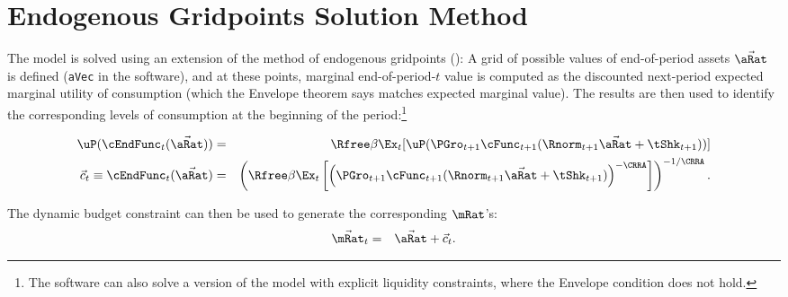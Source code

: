\documentclass[../BufferStockTheory.tex]{subfiles}
\begin{document}
\section{Endogenous Gridpoints Solution Method}

  The model is solved using an extension of the method of endogenous
  gridpoints (\cite{carrollEGM}): A grid of possible values of
  end-of-period assets $\vec{\aRat}$ is defined (\texttt{aVec} in the
  software), and at these points, marginal end-of-period-$t$ value is
  computed as the discounted next-period expected marginal utility of
  consumption (which the Envelope theorem says matches expected
  marginal value).  The results are then used to identify the
  corresponding levels of consumption at the beginning of the period:\footnote{The software can also
solve a version of the model with explicit liquidity constraints, where the Envelope condition does not hold.}

\begin{eqnarray}
  \uP(\cEndFunc_{t}(\vec{\aRat})) & = & \Rfree \beta \Ex_{t}[ \uP(\PGro_{t+1}
  \cFunc_{t+1}(\Rnorm_{t+1}\vec{\aRat} + \tShk_{t+1}))] \label{eq:cEulerEndog}
\\ \vec{c}_{t} \equiv \cEndFunc_{t}(\vec{\aRat}) & = & \left(\Rfree \beta \Ex_{t}\left[ \left(\PGro_{t+1}
      \cFunc_{t+1}(\Rnorm_{t+1}\vec{\aRat} +
      \tShk_{t+1})\right)^{-\CRRA}\right]\right)^{-1/\CRRA}. \notag
\end{eqnarray}

The dynamic budget constraint can then be used to generate the corresponding $\mRat$'s:
\begin{eqnarray*}
  \vec{\mRat}_{t} & = & \vec{\aRat}+\vec{c}_{t}.
\end{eqnarray*}
\end{document}
